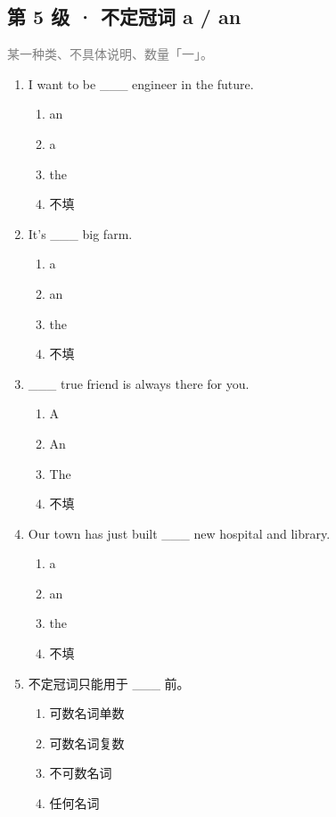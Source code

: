 \documentclass[11pt,a4paper]{ctexart}
\begin{document}
\subsection*{第 5 级 · 不定冠词 a / an}
\noindent\textcolor{gray}{某一种类、不具体说明、数量「一」。}\par\smallskip
\begin{enumerate}[leftmargin=*,itemsep=4pt]
\item I want to be \_\_\_ engineer in the future.
\begin{enumerate}[label=\Alph*.,leftmargin=2em,itemsep=1pt,topsep=2pt]
\item an
\item a
\item the
\item 不填
\end{enumerate}
\item It’s \_\_\_ big farm.
\begin{enumerate}[label=\Alph*.,leftmargin=2em,itemsep=1pt,topsep=2pt]
\item a
\item an
\item the
\item 不填
\end{enumerate}
\item \_\_\_ true friend is always there for you.
\begin{enumerate}[label=\Alph*.,leftmargin=2em,itemsep=1pt,topsep=2pt]
\item A
\item An
\item The
\item 不填
\end{enumerate}
\item Our town has just built \_\_\_ new hospital and library.
\begin{enumerate}[label=\Alph*.,leftmargin=2em,itemsep=1pt,topsep=2pt]
\item a
\item an
\item the
\item 不填
\end{enumerate}
\item 不定冠词只能用于 \_\_\_ 前。
\begin{enumerate}[label=\Alph*.,leftmargin=2em,itemsep=1pt,topsep=2pt]
\item 可数名词单数
\item 可数名词复数
\item 不可数名词
\item 任何名词

\end{enumerate}
\end{enumerate}
\end{document}
